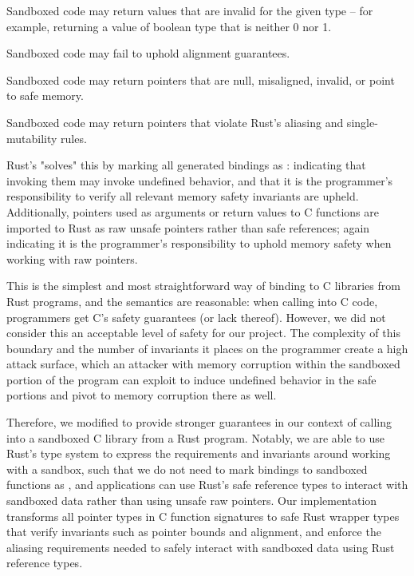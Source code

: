 \squishlist
    \item Sandboxed code may return values that are invalid for the given type -- for example,
        returning a value of boolean type that is neither 0 nor 1.
    \item Sandboxed code may fail to uphold alignment guarantees.
    \item Sandboxed code may return pointers that are null, misaligned, invalid, or point to safe
        memory.
    \item Sandboxed code may return pointers that violate Rust's aliasing and single-mutability
        rules.
\squishend

Rust's  "solves" this by marking all generated bindings as : indicating
that invoking them may invoke undefined behavior, and that it is the programmer's responsibility to
verify all relevant memory safety invariants are upheld. Additionally, pointers used as arguments or
return values to C functions are imported to Rust as raw unsafe pointers rather than safe
references; again indicating it is the programmer's responsibility to uphold memory safety when
working with raw pointers.

This is the simplest and most straightforward way of binding to C libraries from Rust programs, and
the semantics are reasonable: when calling into C code, programmers get C's safety guarantees (or
lack thereof). However, we did not consider this an acceptable level of safety for our project. The
complexity of this boundary and the number of invariants it places on the programmer create a high
attack surface, which an attacker with memory corruption within the sandboxed portion of the program
can exploit to induce undefined behavior in the safe portions and pivot to memory corruption there
as well.

Therefore, we modified  to provide stronger guarantees in our context of calling into
a sandboxed C library from a Rust program. Notably, we are able to use Rust's type system to express
the requirements and invariants around working with a sandbox, such that we do not need to mark
bindings to sandboxed functions as , and applications can use Rust's safe reference
types to interact with sandboxed data rather than using unsafe raw pointers. Our implementation
transforms all pointer types in C function signatures to safe Rust wrapper types that verify
invariants such as pointer bounds and alignment, and enforce the aliasing requirements needed to
safely interact with sandboxed data using Rust reference types.
